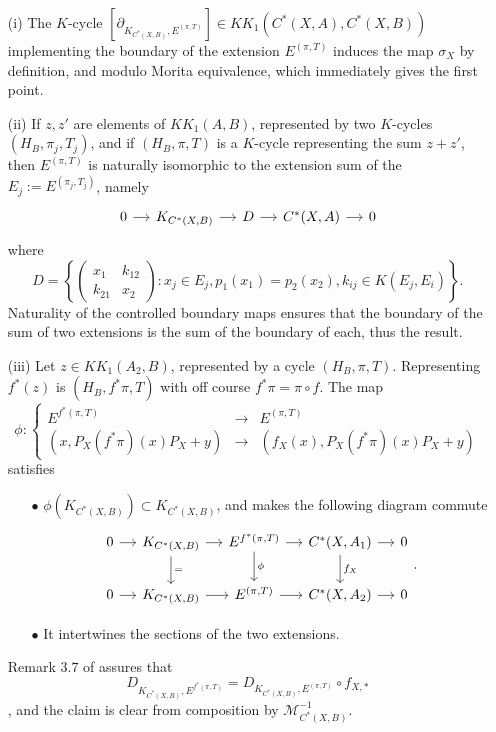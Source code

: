 \begin{dem}
\begin{enumerate}

\item[(i)]The $K$-cycle $[\partial_{K_{C^*(X,B)},E^{(\pi,T)}}]\in KK_1(C^*(X,A), C^*(X,B))$ implementing the boundary of the extension $E^{(\pi,T)}$ induces the map $\sigma_X$ by definition, and modulo Morita equivalence, which immediately gives the first point.

\item[(ii)] If $z,z'$ are elements of $KK_1(A,B)$, represented by two $K$-cycles $(H_B,\pi_j,T_j)$, and if $(H_B,\pi,T)$ is a $K$-cycle representing the sum $z+z'$, then $E^{(\pi,T)}$ is naturally isomorphic to the extension sum of the $E_j:=E^{(\pi_j,T_j)}$, namely
\[\begin{tikzcd}[column sep = small]
0\arrow{r} & K_{C^*(X,B)} \arrow{r} & D \arrow{r} & C^*(X,A) \arrow{r} & 0
\end{tikzcd}\]
where 
\[D=\left\{\begin{pmatrix}x_1 & k_{12}\\ k_{21} & x_2\end{pmatrix} : x_j\in E_j , p_1(x_1)=p_2(x_2), k_{ij}\in K(E_j,E_i)\right\}.\]
Naturality of the controlled boundary maps \cite{OY2} ensures that the boundary of the sum of two extensions is the sum of the boundary of each, thus the result.
\item[(iii)] Let $z\in KK_1(A_2,B)$, represented by a cycle $(H_B,\pi,T)$. Representing $f^*(z)$ is $(H_B,f^*\pi,T)$ with off course $f^*\pi=\pi \circ f$. The map 
\[\phi : \left\{\begin{array}{lll} E^{f^*(\pi,T)} & \rightarrow & E^{(\pi,T)} \\
( x, P_X(f^*\pi)(x)P_X+y) & \rightarrow & ( f_X(x), P_X(f^*\pi)(x)P_X+y) \end{array}\right. \]
satisfies
\begin{enumerate}
\item[$\bullet$] $\phi(K_{C^*(X,B)})\subset K_{C^*(X,B)}$, and makes the following diagram commute
\[\begin{tikzcd}[column sep = small]
0\arrow{r} & K_{C^*(X,B)}\arrow{r}\arrow{d}{=} & E^{f^*(\pi,T)} \arrow{r}\arrow{d}{\phi}& C^*(X,A_1)\arrow{r}\arrow{d}{f_X} & 0\\
0\arrow{r} & K_{C^*(X,B)}\arrow{r} & E^{(\pi,T)} \arrow{r}& C^*(X,A_2)\arrow{r} & 0
\end{tikzcd}.\]
\item[$\bullet$] It intertwines the sections of the two extensions.
\end{enumerate}
Remark $3.7$ of \cite{OY2} assures that \[D_{K_{C^*(X,B)}, E^{f^*(\pi,T)} } =  D_{K_{C^*(X,B)}, E^{(\pi,T)} }\circ f_{X,*}\], and the claim is clear from composition by $\mathcal M_{C^*(X,B)}^{-1}$.


\end{enumerate}
\end{dem}
